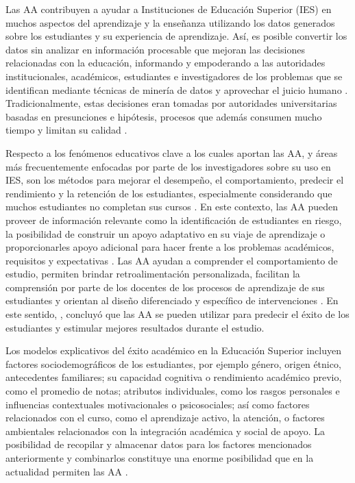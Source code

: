 \documentclass[spanish]{textolivre}
\begin{document}
Las AA contribuyen a ayudar a Instituciones de Educación Superior (IES) en muchos aspectos del aprendizaje y la enseñanza utilizando los datos generados sobre los estudiantes y su experiencia de aprendizaje. Así, es posible convertir los datos sin analizar en información procesable que mejoran las decisiones relacionadas con la educación, informando y empoderando a las autoridades institucionales, académicos, estudiantes e investigadores de los problemas que se identifican mediante técnicas de minería de datos y aprovechar el juicio humano \cite{guerra2020, hooda2020}. Tradicionalmente, estas decisiones eran tomadas por autoridades universitarias basadas en presunciones e hipótesis, procesos que además consumen mucho tiempo y limitan su calidad \cite{hooda2020}.

Respecto a los fenómenos educativos clave a los cuales aportan las AA, y áreas más frecuentemente enfocadas por parte de los investigadores sobre su uso en IES, son los métodos para mejorar el desempeño, el comportamiento, predecir el rendimiento y la retención de los estudiantes, especialmente considerando que muchos estudiantes no completan sus cursos \cite{guerra2020}. En este contexto, las AA pueden proveer de información relevante como la identificación de estudiantes en riesgo, la posibilidad de construir un apoyo adaptativo en su viaje de aprendizaje o proporcionarles apoyo adicional para hacer frente a los problemas académicos, requisitos y expectativas \cite{ifenthaler2020b}. Las AA ayudan a comprender el comportamiento de estudio, permiten brindar retroalimentación personalizada, facilitan la comprensión por parte de los docentes de los procesos de aprendizaje de sus estudiantes y orientan al diseño diferenciado y específico de intervenciones \cite{ifenthaler2020b, sahin2019}. En este sentido, \textcite{zhang2020}, concluyó que las AA se pueden utilizar para predecir el éxito de los estudiantes y estimular mejores resultados durante el estudio.

Los modelos explicativos del éxito académico en la Educación Superior incluyen factores sociodemográficos de los estudiantes, por ejemplo género, origen étnico, antecedentes familiares; su capacidad cognitiva o rendimiento académico previo, como el promedio de notas; atributos individuales, como los  rasgos personales e influencias contextuales motivacionales o psicosociales; así como factores relacionados con el curso, como el aprendizaje activo, la atención, o factores ambientales relacionados con la integración académica y social de apoyo. La posibilidad de recopilar y almacenar datos para los factores mencionados anteriormente y combinarlos constituye una enorme posibilidad que en la actualidad permiten las AA \cite{ifenthaler2020b}.
\end{document}
